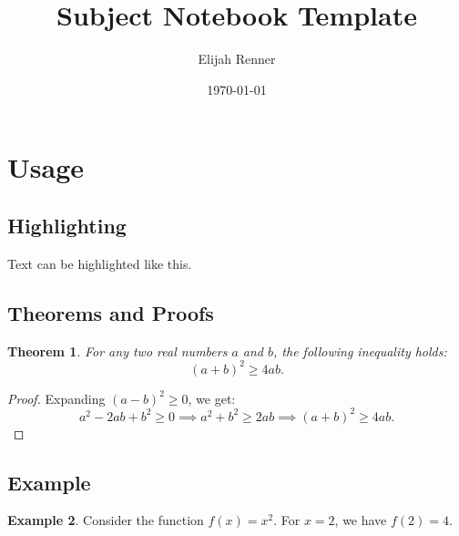 \documentclass[10pt]{article}
\title{Subject Notebook Template}
\author{Elijah Renner}
\date{\today}
\theoremstyle{plain}
\newtheorem{theorem}{Theorem}[section]
\theoremstyle{definition}
\newtheorem{example}[theorem]{Example}
\theoremstyle{remark}
\newcommand{\highlight}[1]{\textcolor{mypink}{#1}}
\begin{document}
\maketitle
\tableofcontents

\section{Usage}
\subsection{Highlighting}
Text can be \highlight{highlighted} like this.

\subsection{Theorems and Proofs}
\begin{theorem}
For any two real numbers \(a\) and \(b\), the following inequality holds:
\[
(a+b)^2 \geq 4ab.
\]
\end{theorem}

\begin{proof}
Expanding \( (a - b)^2 \geq 0 \), we get:
\[
a^2 - 2ab + b^2 \geq 0 \implies a^2 + b^2 \geq 2ab \implies (a + b)^2 \geq 4ab.
\]
\end{proof}

\subsection{Example}
\begin{example}
Consider the function \(f(x) = x^2\). For \(x = 2\), we have \(f(2) = 4\).
\end{example}
\end{document}
